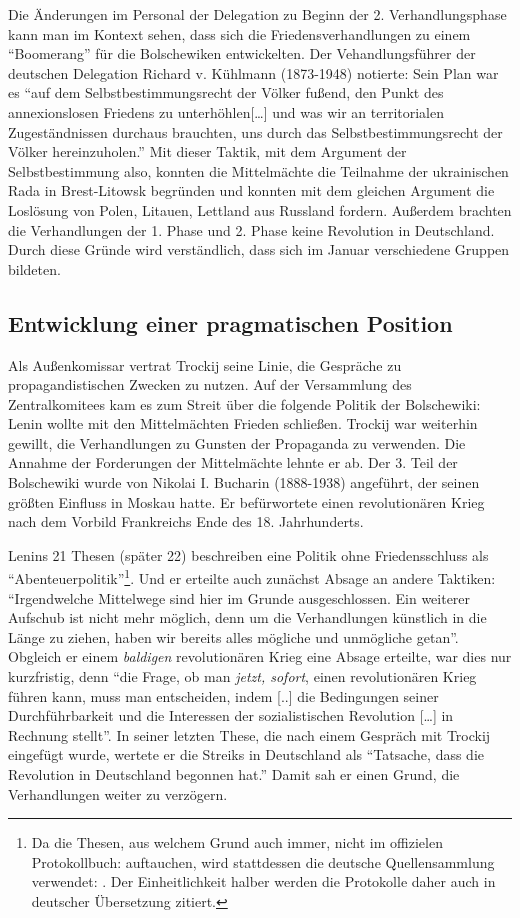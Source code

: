 \documentclass[12pt,headsepline,a4paper]{scrartcl}
\begin{document}
Die Änderungen im Personal der Delegation zu Beginn der 2. Verhandlungsphase kann man im Kontext sehen, dass sich die Friedensverhandlungen zu einem "`Boomerang"'\autocite[17]{maka2010} für die Bolschewiken entwickelten. Der Vehandlungsführer der deutschen Delegation Richard v. Kühlmann (1873-1948) notierte: Sein Plan war es "`auf dem Selbstbestimmungsrecht der Völker fußend, den Punkt des annexionslosen Friedens zu unterhöhlen[\ldots] und was wir an territorialen Zugeständnissen durchaus brauchten, uns durch das Selbstbestimmungsrecht der Völker hereinzuholen."'\autocite[21]{baum1966}
Mit dieser Taktik, mit dem Argument der Selbstbestimmung also, konnten die Mittelmächte die Teilnahme der ukrainischen Rada in Brest-Litowsk begründen und konnten mit dem gleichen Argument die Loslösung von Polen, Litauen, Lettland aus Russland fordern. Außerdem brachten die Verhandlungen der 1. Phase und 2. Phase keine Revolution in Deutschland. Durch diese Gründe wird verständlich, dass sich im Januar verschiedene Gruppen bildeten.

\subsection{Entwicklung einer pragmatischen Position}
Als Außenkomissar vertrat Trockij seine Linie, die Gespräche zu propagandistischen Zwecken zu nutzen. Auf der Versammlung des Zentralkomitees kam es zum Streit über die folgende Politik der Bolschewiki:
Lenin wollte mit den Mittelmächten Frieden schließen. Trockij war weiterhin gewillt, die Verhandlungen zu Gunsten der Propaganda zu verwenden. Die Annahme der Forderungen der Mittelmächte lehnte er ab.  Der 3. Teil der Bolschewiki wurde von Nikolai I. Bucharin (1888-1938) angeführt, der seinen größten Einfluss in Moskau hatte. Er befürwortete einen revolutionären Krieg nach dem Vorbild Frankreichs Ende des 18. Jahrhunderts.

Lenins 21 Thesen (später 22) beschreiben eine Politik ohne Friedensschluss als "`Abenteuerpolitik"'\footnote{Da die Thesen, aus welchem Grund auch immer, nicht im offizielen Protokollbuch:  auftauchen, wird stattdessen die deutsche Quellensammlung verwendet: . Der Einheitlichkeit halber werden die Protokolle daher auch in deutscher Übersetzung zitiert.}. Und er erteilte auch zunächst Absage an andere Taktiken: "`Irgendwelche Mittelwege sind hier im Grunde ausgeschlossen. Ein weiterer Aufschub ist nicht mehr möglich, denn um die Verhandlungen künstlich in die Länge zu ziehen, haben wir bereits alles mögliche und unmögliche getan"'\autocite[102]{baum1969}. 
Obgleich er einem \textit{baldigen} revolutionären Krieg eine Absage erteilte, war dies nur kurzfristig, denn "`die Frage, ob man \textit{jetzt, sofort}, einen revolutionären Krieg führen kann, muss man entscheiden, indem [..] die Bedingungen seiner Durchführbarkeit und die Interessen der sozialistischen Revolution [\ldots] in Rechnung stellt"'\autocite[105]{baum1969}.
In seiner letzten These, die nach einem Gespräch mit Trockij eingefügt wurde, wertete er die Streiks in Deutschland als "`Tatsache, dass die Revolution in Deutschland begonnen hat."'\autocite[108]{baum1969} 
Damit sah er einen Grund, die Verhandlungen weiter zu verzögern.
\end{document}
